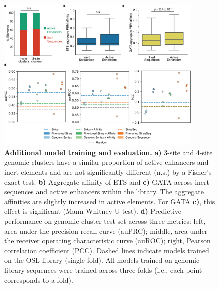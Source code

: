 \begin{figure}[p]
    \centering
    \includegraphics[width=0.88\textwidth]{2_figures-and-files/SuppFig15.png}
    \caption[Additional model training and evaluation.]{\textbf{Additional model training and evaluation.} \textbf{a)} 3-site and 4-site genomic clusters have a similar proportion of active enhancers and inert elements and are not significantly different (n.s.) by a Fisher’s exact test. \textbf{b)} Aggregate affinity of ETS and \textbf{c)} GATA across inert sequences and active enhancers within the library. The aggregate affinities are slightly increased in active elements. For GATA \textbf{c)}, this effect is significant (Mann-Whitney U test). \textbf{d)} Predictive performance on genomic cluster test set across three metrics: left, area under the precision-recall curve (auPRC); middle, area under the receiver operating characteristic curve (auROC); right, Pearson correlation coefficient (PCC). Dashed lines indicate models trained on the OSL library (single fold). All models trained on genomic library sequences were trained across three folds (i.e., each point corresponds to a fold).}
    \label{fig:2 supplementary_15}
\end{figure}


